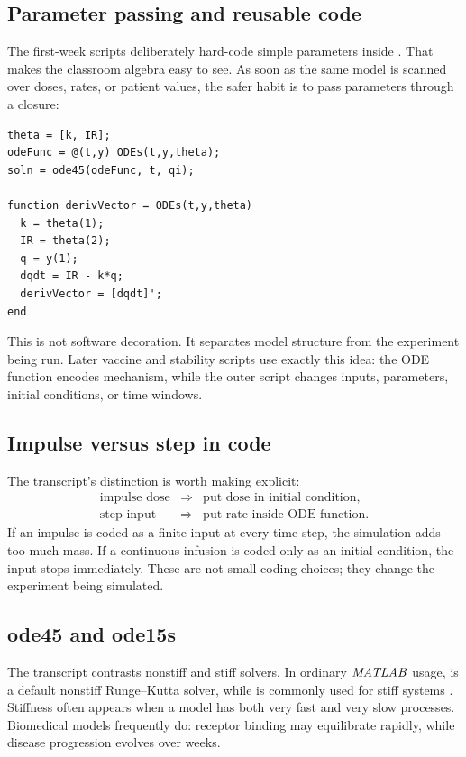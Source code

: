\documentclass[a4paper]{article}
\newcommand{\MATLAB}{\ensuremath{\pksym{MATLAB}}}
\newcommand{\code}[1]{\texttt{\detokenize{#1}}}
\begin{document}
\subsection{Parameter passing and reusable code}

The first-week scripts deliberately hard-code simple parameters inside \code{ODEs}. That makes the classroom algebra easy to see. As soon as the same model is scanned over doses, rates, or patient values, the safer habit is to pass parameters through a closure:
\begin{verbatim}
theta = [k, IR];
odeFunc = @(t,y) ODEs(t,y,theta);
soln = ode45(odeFunc, t, qi);

function derivVector = ODEs(t,y,theta)
  k = theta(1);
  IR = theta(2);
  q = y(1);
  dqdt = IR - k*q;
  derivVector = [dqdt]';
end
\end{verbatim}
This is not software decoration. It separates model structure from the experiment being run. Later vaccine and stability scripts use exactly this idea: the ODE function encodes mechanism, while the outer script changes inputs, parameters, initial conditions, or time windows.

\subsection{Impulse versus step in code}

The transcript's distinction is worth making explicit:
\[
  \begin{array}{lll}
  \text{impulse dose} & \Rightarrow & \text{put dose in initial condition},\\
  \text{step input} & \Rightarrow & \text{put rate inside ODE function}.
  \end{array}
\]
If an impulse is coded as a finite input at every time step, the simulation adds too much mass. If a continuous infusion is coded only as an initial condition, the input stops immediately. These are not small coding choices; they change the experiment being simulated.

\subsection{ode45 and ode15s}

The transcript contrasts nonstiff and stiff solvers. In ordinary \MATLAB{} usage, \code{ode45} is a default nonstiff Runge--Kutta solver, while \code{ode15s} is commonly used for stiff systems \cite{bmeg671TranscriptAug292025,bmeg671TranscriptSep032025}. Stiffness often appears when a model has both very fast and very slow processes. Biomedical models frequently do: receptor binding may equilibrate rapidly, while disease progression evolves over weeks.
\end{document}
